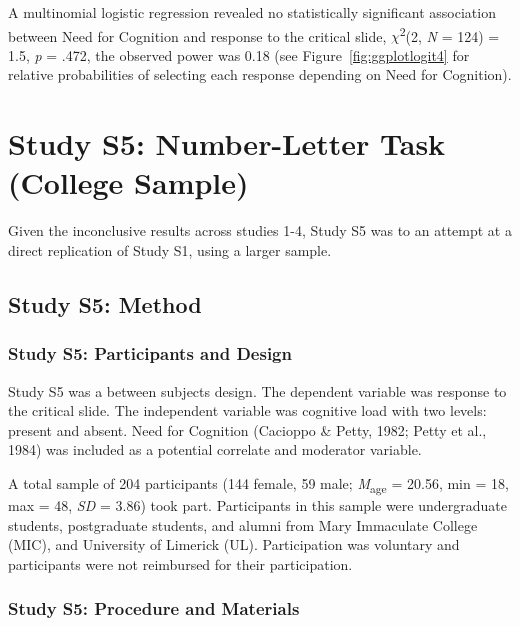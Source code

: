 \documentclass[
  man,floatsintext]{apa6}
\begin{document}
A multinomial logistic regression revealed no statistically significant association between Need for Cognition and response to the critical slide, \(\chi\)\textsuperscript{2}(2, \emph{N} = 124) = 1.5, \emph{p} = .472, the observed power was 0.18 (see Figure~\ref{fig:ggplotlogit4} for relative probabilities of selecting each response depending on Need for Cognition).

\newpage

\hypertarget{study-s5-number-letter-task-college-sample}{%
\section{Study S5: Number-Letter Task (College Sample)}\label{study-s5-number-letter-task-college-sample}}

Given the inconclusive results across studies 1-4, Study S5 was to an attempt at a direct replication of Study S1, using a larger sample.

\hypertarget{study-s5-method}{%
\subsection{Study S5: Method}\label{study-s5-method}}

\hypertarget{study-s5-participants-and-design}{%
\subsubsection{Study S5: Participants and Design}\label{study-s5-participants-and-design}}

Study S5 was a between subjects design. The dependent variable was response to the critical slide. The independent variable was cognitive load with two levels: present and absent. Need for Cognition (Cacioppo \& Petty, 1982; Petty et al., 1984) was included as a potential correlate and moderator variable.

A total sample of 204 participants (144 female, 59 male; \emph{M}\textsubscript{age} = 20.56, min = 18, max = 48, \emph{SD} = 3.86) took part. Participants in this sample were undergraduate students, postgraduate students, and alumni from Mary Immaculate College (MIC), and University of Limerick (UL). Participation was voluntary and participants were not reimbursed for their participation.

\hypertarget{study-s5-procedure-and-materials}{%
\subsubsection{Study S5: Procedure and Materials}\label{study-s5-procedure-and-materials}}
\end{document}
